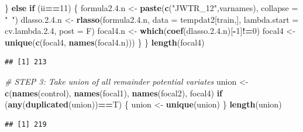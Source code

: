 \documentclass[
]{article}
\newenvironment{Shaded}{\begin{snugshade}}{\end{snugshade}}
\newcommand{\CommentTok}[1]{\textcolor[rgb]{0.56,0.35,0.01}{\textit{#1}}}
\newcommand{\ControlFlowTok}[1]{\textcolor[rgb]{0.13,0.29,0.53}{\textbf{#1}}}
\newcommand{\DataTypeTok}[1]{\textcolor[rgb]{0.13,0.29,0.53}{#1}}
\newcommand{\DecValTok}[1]{\textcolor[rgb]{0.00,0.00,0.81}{#1}}
\newcommand{\FloatTok}[1]{\textcolor[rgb]{0.00,0.00,0.81}{#1}}
\newcommand{\KeywordTok}[1]{\textcolor[rgb]{0.13,0.29,0.53}{\textbf{#1}}}
\newcommand{\NormalTok}[1]{#1}
\newcommand{\OperatorTok}[1]{\textcolor[rgb]{0.81,0.36,0.00}{\textbf{#1}}}
\newcommand{\StringTok}[1]{\textcolor[rgb]{0.31,0.60,0.02}{#1}}
\begin{document}
\begin{Shaded}
\begin{Highlighting}[]
\NormalTok{  \} }\ControlFlowTok{else} \ControlFlowTok{if}\NormalTok{ (ii}\OperatorTok{==}\DecValTok{11}\NormalTok{) \{}
\NormalTok{    formula2.}\FloatTok{4.}\NormalTok{n <-}\StringTok{ }\KeywordTok{paste}\NormalTok{(}\KeywordTok{c}\NormalTok{(}\StringTok{"JWTR_12"}\NormalTok{,varnames), }\DataTypeTok{collapse =} \StringTok{"~"}\NormalTok{)}
\NormalTok{    dlasso.}\DecValTok{2}\NormalTok{.}\FloatTok{4.}\NormalTok{n <-}\StringTok{ }\KeywordTok{rlasso}\NormalTok{(formula2.}\FloatTok{4.}\NormalTok{n, }\DataTypeTok{data =}\NormalTok{ tempdat2[train,], }
                           \DataTypeTok{lambda.start =}\NormalTok{ cv.lambda.}\FloatTok{2.4}\NormalTok{, }\DataTypeTok{post =}\NormalTok{ F)}
\NormalTok{    focal4.n <-}\StringTok{ }\KeywordTok{which}\NormalTok{(}\KeywordTok{coef}\NormalTok{(dlasso.}\DecValTok{2}\NormalTok{.}\FloatTok{4.}\NormalTok{n)[}\OperatorTok{-}\DecValTok{1}\NormalTok{]}\OperatorTok{!=}\DecValTok{0}\NormalTok{)}
\NormalTok{    focal4 <-}\StringTok{ }\KeywordTok{unique}\NormalTok{(}\KeywordTok{c}\NormalTok{(focal4, }\KeywordTok{names}\NormalTok{(focal4.n)))}
\NormalTok{  \}}
\NormalTok{\}}
\KeywordTok{length}\NormalTok{(focal4)}
\end{Highlighting}
\end{Shaded}

\begin{verbatim}
## [1] 213
\end{verbatim}

\begin{Shaded}
\begin{Highlighting}[]
\CommentTok{# STEP 3: Take union of all remainder potential variates}
\NormalTok{union <-}\StringTok{ }\KeywordTok{c}\NormalTok{(}\KeywordTok{names}\NormalTok{(control), }\KeywordTok{names}\NormalTok{(focal1), }\KeywordTok{names}\NormalTok{(focal2), focal4)}
\ControlFlowTok{if}\NormalTok{ (}\KeywordTok{any}\NormalTok{(}\KeywordTok{duplicated}\NormalTok{(union))}\OperatorTok{==}\NormalTok{T) \{}
\NormalTok{  union <-}\StringTok{ }\KeywordTok{unique}\NormalTok{(union)}
\NormalTok{\}}
\KeywordTok{length}\NormalTok{(union)}
\end{Highlighting}
\end{Shaded}

\begin{verbatim}
## [1] 219
\end{verbatim}
\end{document}

